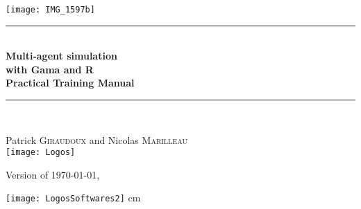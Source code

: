 \documentclass[a4paper,12pt]{book}
\makeatletter
\def\cleardoublepage{\clearpage\if@twoside \ifodd\c@page\else%
  \hbox{}%
  \thispagestyle{empty}%
  \newpage%
  \if@twocolumn\hbox{}\newpage\fi\fi\fi}
\makeatother
\begin{document}

\begin{titlepage}
\begin{center}

\texttt{[image: IMG\_1597b]}\\[0.5cm]


\rule{\linewidth}{0.5mm} \\[0.3cm]
{ \huge \bfseries Multi-agent simulation\\with Gama and R \\[0.3cm]
\Large Practical Training Manual}\\[0.3cm]
\rule{\linewidth}{0.5mm} \\[0.5cm]


\noindent

\large Patrick \textsc{Giraudoux} and  Nicolas \textsc{Marilleau}\\[0.5cm]

\texttt{[image: Logos]}\\[0.5cm]

\vfill

{\small Version of \today, \currenttime}


\end{center}
\end{titlepage}


\frontmatter


\clearpage




\vspace*{\fill}

\begin{center}
\texttt{[image: LogosSoftwares2]}
 cm
	\color{red}
\end{center}
\vfill

\tableofcontents



\mainmatter
\pagestyle{fancy}

\cleardoublepage









\clearpage
\end{document}

